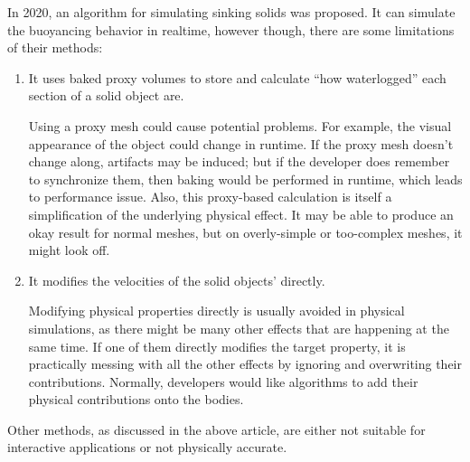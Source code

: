 In 2020, an algorithm for simulating sinking solids was proposed\cite{RBM20}.
It can simulate the buoyancing behavior in realtime, however though, there are some limitations of their methods:
\begin{enumerate}
	\item It uses baked proxy volumes to store and calculate ``how waterlogged'' each section of a solid object are.

		Using a proxy mesh could cause potential problems.
		For example, the visual appearance of the object could change in runtime.
		If the proxy mesh doesn't change along, artifacts may be induced;
		but if the developer does remember to synchronize them, then baking would be performed in runtime, which leads to performance issue.
		Also, this proxy-based calculation is itself a simplification of the underlying physical effect.
		It may be able to produce an okay result for normal meshes, but on overly-simple or too-complex meshes, it might look off.

	\item It modifies the velocities of the solid objects' directly.

		Modifying physical properties directly is usually avoided in physical simulations, as there might be many other effects that are happening at the same time.
		If one of them directly modifies the target property, it is practically messing with all the other effects by ignoring and overwriting their contributions.
		Normally, developers would like algorithms to add their physical contributions onto the bodies.

\end{enumerate}
Other methods, as discussed in the above article, are either not suitable for interactive applications or not physically accurate.

